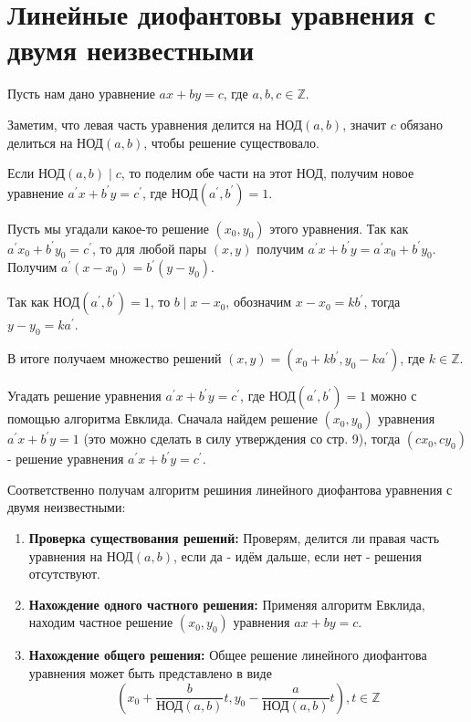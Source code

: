 \documentclass[12pt, a4paper, openany]{book}
\begin{document}
\section{Линейные диофантовы уравнения с двумя
неизвестными}

Пусть нам дано уравнение $ax + by = c$, где $a, b, c \in \mathbb{Z}$.

Заметим, что левая часть уравнения делится на $\text{НОД}(a, b)$, значит $c$ обязано делиться на $\text{НОД}(a, b)$, чтобы решение существовало.

Если $\text{НОД}(a, b) \mid c$, то поделим обе части на этот НОД, получим новое уравнение $a^{'}x + b^{'}y = c^{'}$, где $\text{НОД}(a^{'}, b^{'}) = 1$.

Пусть мы угадали какое-то решение $(x_0, y_0)$ этого уравнения. Так как $a^{'}x_0 + b^{'}y_0 = c^{'}$, то для любой пары $(x, y)$ получим $a^{'}x + b^{'}y = a^{'}x_0 + b^{'}y_0$. Получим $a^{'}(x - x_0) = b^{'}(y-y_0)$.

Так как $\text{НОД}(a^{'}, b^{'}) = 1$, то $b \mid x - x_0$, обозначим $x - x_0 = kb^{'}$, тогда $y - y_0 = ka^{'}$.

\noindent
В итоге получаем множество решений $(x, y) = (x_0 + kb^{'}, y_0 - ka^{'})$, где $k \in \mathbb{Z}$.

Угадать решение уравнения $a^{'}x + b^{'}y = c^{'}$, где $\text{НОД}(a^{'}, b^{'}) = 1$ можно с помощью алгоритма Евклида. Сначала найдем решение $(x_0, y_0)$ уравнения $a^{'}x + b^{'}y = 1$ (это можно сделать в силу утверждения со стр. 9), тогда $(cx_0, cy_0)$ - решение уравнения $a^{'}x + b^{'}y = c^{'}$.

Соответственно получам алгоритм решиния линейного диофантова уравнения с двумя неизвестными:

\begin{enumerate}
    \item \textbf{Проверка существования решений:} Проверям, делится ли правая часть уравнения на $\text{НОД}(a, b)$, если да - идём дальше, если нет - решения отсутствуют.
    \item \textbf{Нахождение одного частного решения:} Применяя алгоритм Евклида, находим частное решение $(x_0, y_0)$ уравнения $ax + by = c$.
    \item \textbf{Нахождение общего решения:} Общее решение линейного диофантова уравнения может быть представлено в виде \\
    \[(x_0 + \frac{b}{\text{НОД}(a, b)} t, y_0 - \frac{a}{\text{НОД}(a, b)} t), t \in \mathbb{Z}\]
\end{enumerate}
\end{document}
